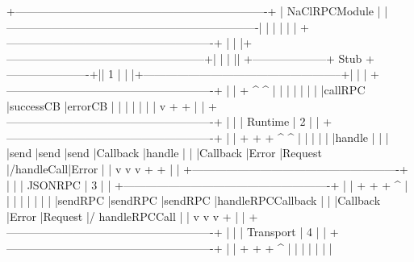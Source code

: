 \begin{code}
+-------------------------------------------------------------------+
|                           NaClRPCModule                           |
|-------------------------------------------------------------------|
|                                                                   |
|                                                                   |
|     +-------------------------------------------------------+     |
|     |+-----------------------------------------------------+|     |
|     || +--------------------+ Stub +----------------------+|| 1   |
|     |+-----------------------------------------------------+|     |
|     +-------------------------------------------------------+     |
|                 +                      ^            ^             |
|                 |                      |            |             |
|                 |callRPC               |successCB   |errorCB      |
|                 |                      |            |             |
|                 v                      +            +             |
|     +-------------------------------------------------------+     |
|     |                        Runtime                        | 2   |
|     +-------------------------------------------------------+     |
|      +          +        +                ^           ^           |
|      |          |        |                |handle     |           |
|      |send      |send    |send            |Callback   |handle     |
|      |Callback  |Error   |Request         |/handleCall|Error      |
|      v          v        v                +           +           |
|     +-------------------------------------------------------+     |
|     |                        JSONRPC                        | 3   |
|     +-------------------------------------------------------+     |
|      +         +         +                ^                       |
|      |         |         |                |                       |
|      |sendRPC  |sendRPC  |sendRPC         |handleRPCCallback      |
|      |Callback |Error    |Request         |/ handleRPCCall        |
|      v         v         v                +                       |
|     +-------------------------------------------------------+     |
|     |                       Transport                       | 4   |
|     +-------------------------------------------------------+     |
|         +        +       +                ^                       |
|         |        |       |                |                       |

\end{code}
